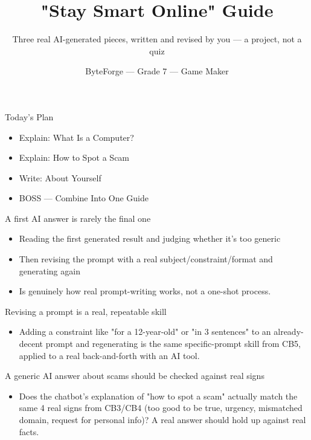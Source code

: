 \documentclass[aspectratio=169]{beamer}
\title{"Stay Smart Online" Guide}
\subtitle{Three real AI-generated pieces, written and revised by you — a project, not a quiz}
\author{ByteForge --- Grade 7 --- Game Maker}
\date{}
\begin{document}
\begin{frame}
    \titlepage
\end{frame}

\begin{frame}{Today's Plan}
    \begin{itemize}
        \item Explain: What Is a Computer?
        \item Explain: How to Spot a Scam
        \item Write: About Yourself
        \item[$\bigstar$] BOSS --- Combine Into One Guide
    \end{itemize}
\end{frame}

\begin{frame}{A first AI answer is rarely the final one}
    \large
    \begin{itemize}
        \item Reading the first generated result and judging whether it's too generic
        \item Then revising the prompt with a real subject/constraint/format and generating again
        \item Is genuinely how real prompt-writing works, not a one-shot process.
    \end{itemize}
\end{frame}


\begin{frame}{Revising a prompt is a real, repeatable skill}
    \large
    \begin{itemize}
        \item Adding a constraint like "for a 12-year-old" or "in 3 sentences" to an already-decent prompt and regenerating is the same specific-prompt skill from CB5, applied to a real back-and-forth with an AI tool.
    \end{itemize}
\end{frame}


\begin{frame}{A generic AI answer about scams should be checked against real signs}
    \large
    \begin{itemize}
        \item Does the chatbot's explanation of "how to spot a scam" actually match the same 4 real signs from CB3/CB4 (too good to be true, urgency, mismatched domain, request for personal info)? A real answer should hold up against real facts.
    \end{itemize}
\end{frame}
\end{document}
